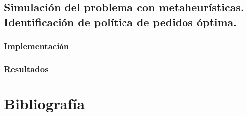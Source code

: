 \documentclass[a4paper,12pt]{article}
\begin{document}
	\subsection{Simulación del problema con metaheurísticas. Identificación de política de pedidos óptima.}
	
	\subsubsection{Implementación}
	
	\subsubsection{Resultados}
	
\newpage
	\section*{Bibliografía}
	
	
	
\end{document}
